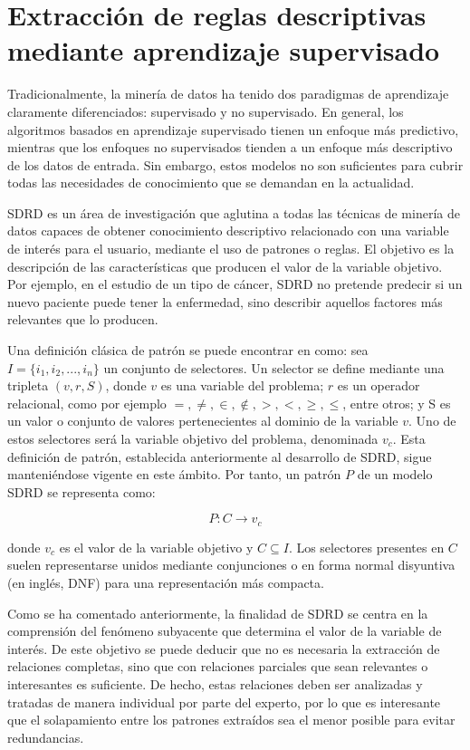 \documentclass[c5paper,10pt,twoside]{book}	   	%
\begin{document}
\section{Extracción de reglas descriptivas mediante aprendizaje supervisado} \label{sec:sdrd}

Tradicionalmente, la minería de datos ha tenido dos paradigmas de aprendizaje claramente diferenciados: supervisado y no supervisado. En general, los algoritmos basados en aprendizaje supervisado tienen un enfoque más predictivo, mientras que los enfoques no supervisados tienden a un enfoque más descriptivo de los datos de entrada. Sin embargo, estos modelos no son suficientes para cubrir todas las necesidades de conocimiento que se demandan en la actualidad.

\ac{SDRD} \cite{Nlw09} es un área de investigación que aglutina a todas las técnicas de minería de datos capaces de obtener conocimiento descriptivo relacionado con una variable de interés para el usuario, mediante el uso de patrones o reglas. El objetivo es la descripción de las características que producen el valor de la variable objetivo. Por ejemplo, en el estudio de un tipo de cáncer, \ac{SDRD} no pretende predecir si un nuevo paciente puede tener la enfermedad, sino describir aquellos factores más relevantes que lo producen. 

Una definición clásica de patrón se puede encontrar en \cite{Ms82} como: sea $I = \lbrace i_1, i_2,...,i_n \rbrace$ un conjunto de selectores. Un selector se define mediante una tripleta $(v, r, S)$, donde $v$ es una variable del problema; $r$ es un operador relacional, como por ejemplo $=,\neq,\in,\notin,>,<,\geq,\leq$, entre otros; y S es un valor o conjunto de valores pertenecientes al dominio de la variable $v$. Uno de estos selectores será la variable objetivo del problema, denominada $v_c$. Esta definición de patrón, establecida anteriormente al desarrollo de \ac{SDRD}, sigue manteniéndose vigente en este ámbito. Por tanto, un patrón $P$ de un modelo \ac{SDRD} se representa como: 

\begin{equation}
P: C \rightarrow v_c
\end{equation}

\noindent donde $v_c$ es el valor de la variable objetivo y $C \subseteq I$.  Los selectores presentes en $C$ suelen representarse unidos mediante conjunciones o en forma normal disyuntiva (en inglés, \ac{DNF}) para una representación más compacta.


Como se ha comentado anteriormente, la finalidad de \ac{SDRD} se centra en la comprensión del fenómeno subyacente que determina el valor de la variable de interés. De este objetivo se puede deducir que no es necesaria la extracción de relaciones completas, sino que con relaciones parciales que sean relevantes o interesantes es suficiente. De hecho, estas relaciones deben ser analizadas y tratadas de manera individual por parte del experto, por lo que es interesante que el solapamiento entre los patrones extraídos sea el menor posible para evitar redundancias.
\end{document}

